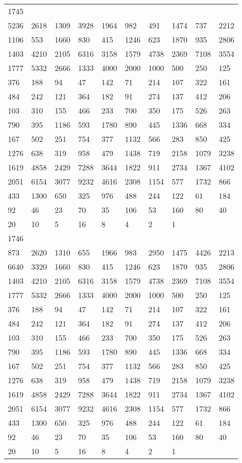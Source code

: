 \begin{longtable}{*{10}{l}}
1745&&&&&&&&&\\
5236& 2618& 1309& 3928& 1964& 982& 491& 1474& 737& 2212\\
1106& 553& 1660& 830& 415& 1246& 623& 1870& 935& 2806\\
1403& 4210& 2105& 6316& 3158& 1579& 4738& 2369& 7108& 3554\\
1777& 5332& 2666& 1333& 4000& 2000& 1000& 500& 250& 125\\
376& 188& 94& 47& 142& 71& 214& 107& 322& 161\\
484& 242& 121& 364& 182& 91& 274& 137& 412& 206\\
103& 310& 155& 466& 233& 700& 350& 175& 526& 263\\
790& 395& 1186& 593& 1780& 890& 445& 1336& 668& 334\\
167& 502& 251& 754& 377& 1132& 566& 283& 850& 425\\
1276& 638& 319& 958& 479& 1438& 719& 2158& 1079& 3238\\
1619& 4858& 2429& 7288& 3644& 1822& 911& 2734& 1367& 4102\\
2051& 6154& 3077& 9232& 4616& 2308& 1154& 577& 1732& 866\\
433& 1300& 650& 325& 976& 488& 244& 122& 61& 184\\
92& 46& 23& 70& 35& 106& 53& 160& 80& 40\\
20& 10& 5& 16& 8& 4& 2& 1& \\

1746&&&&&&&&&\\
873& 2620& 1310& 655& 1966& 983& 2950& 1475& 4426& 2213\\
6640& 3320& 1660& 830& 415& 1246& 623& 1870& 935& 2806\\
1403& 4210& 2105& 6316& 3158& 1579& 4738& 2369& 7108& 3554\\
1777& 5332& 2666& 1333& 4000& 2000& 1000& 500& 250& 125\\
376& 188& 94& 47& 142& 71& 214& 107& 322& 161\\
484& 242& 121& 364& 182& 91& 274& 137& 412& 206\\
103& 310& 155& 466& 233& 700& 350& 175& 526& 263\\
790& 395& 1186& 593& 1780& 890& 445& 1336& 668& 334\\
167& 502& 251& 754& 377& 1132& 566& 283& 850& 425\\
1276& 638& 319& 958& 479& 1438& 719& 2158& 1079& 3238\\
1619& 4858& 2429& 7288& 3644& 1822& 911& 2734& 1367& 4102\\
2051& 6154& 3077& 9232& 4616& 2308& 1154& 577& 1732& 866\\
433& 1300& 650& 325& 976& 488& 244& 122& 61& 184\\
92& 46& 23& 70& 35& 106& 53& 160& 80& 40\\
20& 10& 5& 16& 8& 4& 2& 1& \\


\end{longtable}
